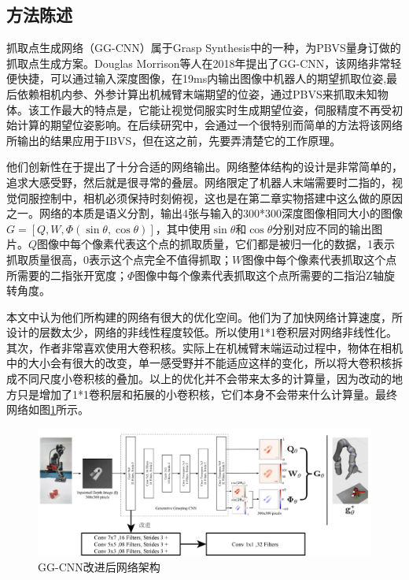 \documentclass[fontset=fandol,type=bachelor,campus=harbin]{hithesisbook}
\begin{document}
\subsection{方法陈述}
抓取点生成网络（GG-CNN）属于Grasp Synthesis中的一种，为PBVS量身订做的抓取点生成方案。Douglas Morrison等人在2018年提出了GG-CNN，该网络非常轻便快捷，可以通过输入深度图像，在19ms内输出图像中机器人的期望抓取位姿,最后依赖相机内参、外参计算出机械臂末端期望的位姿，通过PBVS来抓取未知物体\cite{morrison2018closing}。该工作最大的特点是，它能让视觉伺服实时生成期望位姿，伺服精度不再受初始计算的期望位姿影响。在后续研究中，会通过一个很特别而简单的方法将该网络所输出的结果应用于IBVS，但在这之前，先要弄清楚它的工作原理。


他们创新性在于提出了十分合适的网络输出。网络整体结构的设计是非常简单的，追求大感受野，然后就是很寻常的叠层。网络限定了机器人末端需要时二指的，视觉伺服控制中，相机必须保持时刻俯视，这也是在第二章实物搭建中这么做的原因之一。网络的本质是语义分割，输出4张与输入的300*300深度图像相同大小的图像$G=\left[ Q,W,\varPhi \left( \sin \theta ,\cos \theta \right) \right]$，其中使用$\sin \theta$和$\cos \theta$分别对应不同的输出图片。$Q$图像中每个像素代表这个点的抓取质量，它们都是被归一化的数据，1表示抓取质量很高，0表示这个点完全不值得抓取；$W$图像中每个像素代表抓取这个点所需要的二指张开宽度；$\varPhi$图像中每个像素代表抓取这个点所需要的二指沿Z轴旋转角度。


本文中认为他们所构建的网络有很大的优化空间。他们为了加快网络计算速度，所设计的层数太少，网络的非线性程度较低。所以使用1*1卷积层对网络非线性化。其次，作者非常喜欢使用大卷积核。实际上在机械臂末端运动过程中，物体在相机中的大小会有很大的改变，单一感受野并不能适应这样的变化，所以将大卷积核拆成不同尺度小卷积核的叠加。以上的优化并不会带来太多的计算量，因为改动的地方只是增加了1*1卷积层和拓展的小卷积核，它们本身不会带来什么计算量。最终网络如图\ref{GG-CNN改进}所示。
\begin{figure}[h]
\centering
\includegraphics[width = 1.0\textwidth]{chapter3/GG-CNN改进}
\caption{GG-CNN改进后网络架构}
\label{GG-CNN改进}
\end{figure}
\end{document}
